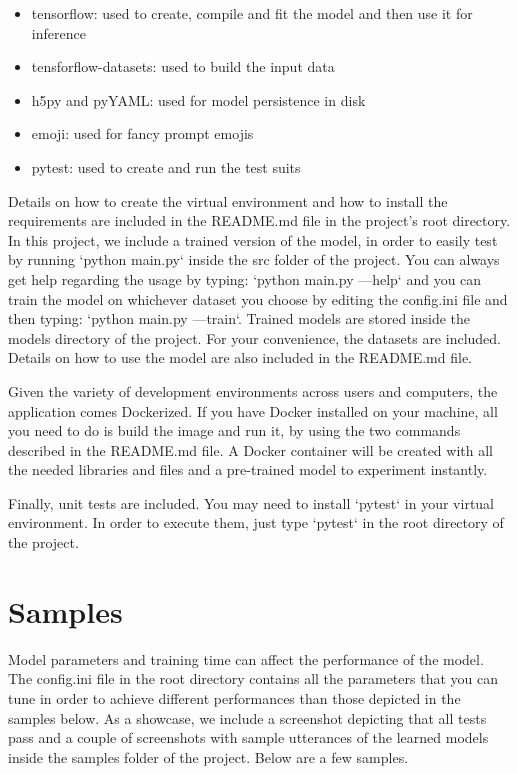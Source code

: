 \documentclass[10pt, twocolumn, a4paper]{article}
\begin{document}
\begin{itemize}
    \item tensorflow: used to create, compile and fit the model and then use it for inference
    \item tensforflow-datasets: used to build the input data
    \item h5py and pyYAML: used for model persistence in disk
    \item emoji: used for fancy prompt emojis
    \item pytest: used to create and run the test suits
\end{itemize}

Details on how to create the virtual environment and how to install the requirements are included in the README.md file in the project’s root directory. In this project, we include a trained version of the model, in order to easily test by running `python main.py` inside the src folder of the project. You can always get help regarding the usage by typing: `python main.py —help` and you can train the model on whichever dataset you choose by editing the config.ini file and then typing: `python main.py —train`. Trained models are stored inside the models directory of the project. For your convenience, the datasets are included. Details on how to use the model are also included in the README.md file.

Given the variety of development environments across users and computers, the application comes Dockerized. If you have Docker installed on your machine, all you need to do is build the image and run it, by using the two commands described in the README.md file. A Docker container will be created with all the needed libraries and files and a pre-trained model to experiment instantly.

Finally, unit tests are included. You may need to install `pytest` in your virtual environment. In order to execute them, just type `pytest` in the root directory of the project.

\section{Samples}
Model parameters and training time can affect the performance of the model. The config.ini file in the root directory contains all the parameters that you can tune in order to achieve different performances than those depicted in the samples below. As a showcase, we include a screenshot depicting that all tests pass and a couple of screenshots with sample utterances of the learned models inside the samples folder of the project. Below are a few samples.
\end{document}
